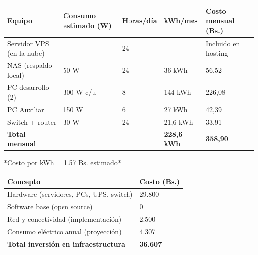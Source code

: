 \documentclass[stu]{apa7}
\begin{document}
\begin{longtable}{|L{4cm}|C{2cm}|C{2cm}|C{2cm}|C{2.5cm}|}
\hline
{}
\textbf{Equipo} & \textbf{Consumo estimado (W)} & \textbf{Horas/día} & \textbf{kWh/mes} & \textbf{Costo mensual (Bs.)} \\
\hline
Servidor VPS (en la nube) & --- & 24 & --- & Incluido en hosting \\
\hline
NAS (respaldo local) & 50 W & 24 & 36 kWh & 56,52 \\
\hline
PC desarrollo (2) & 300 W c/u & 8 & 144 kWh & 226,08 \\
\hline
PC Auxiliar & 150 W & 6 & 27 kWh & 42,39 \\
\hline
Switch + router & 30 W & 24 & 21,6 kWh & 33,91 \\
\hline
{}
\textbf{Total mensual} & & & \textbf{228,6 kWh} & \textbf{358,90} \\
\hline
\end{longtable}

*Costo por kWh = 1.57 Bs. estimado*

\begin{longtable}{|L{8cm}|C{4cm}|}
\hline
{}
\textbf{Concepto} & \textbf{Costo (Bs.)} \\
\hline
Hardware (servidores, PCs, UPS, switch) & 29.800 \\
\hline
Software base (open source) & 0 \\
\hline
Red y conectividad (implementación) & 2.500 \\
\hline
Consumo eléctrico anual (proyección) & 4.307 \\
\hline
{}
\textbf{Total inversión en infraestructura} & \textbf{36.607} \\
\hline
\end{longtable}
\end{document}
